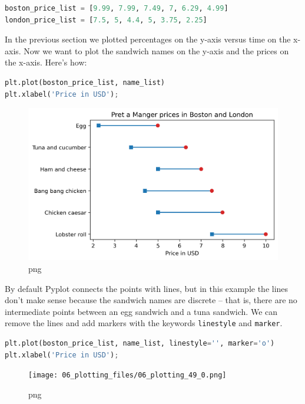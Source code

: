 \documentclass[
]{book}
\newcommand{\passthrough}[1]{#1}
\begin{document}
\begin{lstlisting}[language=Python]
boston_price_list = [9.99, 7.99, 7.49, 7, 6.29, 4.99]
london_price_list = [7.5, 5, 4.4, 5, 3.75, 2.25]
\end{lstlisting}

In the previous section we plotted percentages on the y-axis versus time
on the x-axis. Now we want to plot the sandwich names on the y-axis and
the prices on the x-axis. Here's how:

\begin{lstlisting}[language=Python]
plt.plot(boston_price_list, name_list)
plt.xlabel('Price in USD');
\end{lstlisting}

\begin{figure}
\centering
\includegraphics{06_plotting_files/06_plotting_47_0.png}
\caption{png}
\end{figure}

By default Pyplot connects the points with lines, but in this example
the lines don't make sense because the sandwich names are discrete --
that is, there are no intermediate points between an egg sandwich and a
tuna sandwich. We can remove the lines and add markers with the keywords
\passthrough{\lstinline!linestyle!} and
\passthrough{\lstinline!marker!}.

\begin{lstlisting}[language=Python]
plt.plot(boston_price_list, name_list, linestyle='', marker='o')
plt.xlabel('Price in USD');
\end{lstlisting}

\begin{figure}
\centering
\texttt{[image: 06\_plotting\_files/06\_plotting\_49\_0.png]}
\caption{png}
\end{figure}
\end{document}
